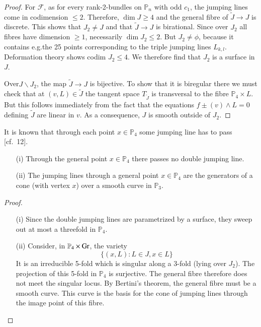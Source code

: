\begin{proof}
For $\mathscr{F}$, as for every rank-2-bundles on $\mathbb{P}_{n}$
with odd $c_{1}$, the jumping lines come in codimension $\leq
2$. Therefore, $\dim J\geq 4$ and the general fibre of
$\widetilde{J}\to J$ is discrete. This shows that $J_{2}\neq J$ and
that $\widetilde{J}\to J$ is birational. Since over $J_{2}$ all fibres
have dimension $\geq 1$, necessarily $\dim J_{2}\leq 2$. But
$J_{2}\neq \phi$, because it contains e.g.\@ the 25 points
corresponding to the triple jumping lines $L_{k,l}$. Deformation
theory shows codim $J_{2}\leq 4$. We therefore find that $J_{2}$ is a
surface in $J$. 

Over\pageoriginale $J\backslash J_{2}$, the map $\widetilde{J}\to J$ is
bijective. To show that it is biregular there we must check that at
$(v,L)\in \widetilde{J}$ the tangent space $T_{\widetilde{J}}$ is
transversal to the fibre $\mathbb{P}_{4}\times L$. But this follows
immediately from the fact that the equations $f\pm (v)\wedge L=0$
defining $\widetilde{J}$ are linear in $v$. As a consequence, $J$ is
smooth outside of $J_{2}$. 
\end{proof}

It is known that through each point $x\in \mathbb{P}_{4}$ some jumping
line has to pass [cf.~12].

\begin{proposition}\label{chap2-prop17}
\begin{itemize}
\item[\rm(i)] Through the general point $x\in \mathbb{P}_{4}$ there
passes no double jumping line.

\item[\rm(ii)] The jumping lines through a general point
$x\in \mathbb{P}_{4}$ are the generators of a cone (with vertex $x$)
over a smooth curve in $\mathbb{P}_{3}$.
\end{itemize}
\end{proposition}

\begin{proof}
\begin{itemize}
\item[(i)] Since the double jumping lines are parametrized by a
surface, they sweep out at most a threefold in $\mathbb{P}_{4}$.

\item[(ii)] Consider, in $\mathbb{P}_{4}\times \operatorname{Gr}$, the variety
$$
\{(x,L):L\in J, x\in L\}
$$
It is an irreducible 5-fold which is singular along a 3-fold (lying
over $J_{2}$). The projection of this 5-fold in $\mathbb{P}_{4}$ is
surjective. The general fibre therefore does not meet the singular
locus. By Bertini's theorem, the general fibre must be a smooth
curve. This curve is the basis for the cone of jumping lines through
the image point of this fibre.
\end{itemize}
\end{proof}

